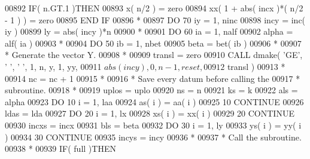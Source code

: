 \begin{DoxyCode}
00892                   \textcolor{keywordflow}{IF}( n.GT.1 )\textcolor{keywordflow}{THEN}
00893                      x( n/2 ) = zero
00894                      xx( 1 + abs( incx )*( n/2 - 1 ) ) = zero
00895 \textcolor{keywordflow}{                  END IF}
00896 \textcolor{comment}{*}
00897                   \textcolor{keywordflow}{DO} 70 iy = 1, ninc
00898                      incy = inc( iy )
00899                      ly = abs( incy )*n
00900 \textcolor{comment}{*}
00901                      \textcolor{keywordflow}{DO} 60 ia = 1, nalf
00902                         alpha = alf( ia )
00903 \textcolor{comment}{*}
00904                         \textcolor{keywordflow}{DO} 50 ib = 1, nbet
00905                            beta = bet( ib )
00906 \textcolor{comment}{*}
00907 \textcolor{comment}{*                          Generate the vector Y.}
00908 \textcolor{comment}{*}
00909                            transl = zero
00910                            \textcolor{keyword}{CALL }dmake( \textcolor{stringliteral}{'GE'}, \textcolor{stringliteral}{' '}, \textcolor{stringliteral}{' '}, 1, n, y, 1, yy,
00911      $                                 abs( incy ), 0, n - 1, reset,
00912      $                                 transl )
00913 \textcolor{comment}{*}
00914                            nc = nc + 1
00915 \textcolor{comment}{*}
00916 \textcolor{comment}{*                          Save every datum before calling the}
00917 \textcolor{comment}{*                          subroutine.}
00918 \textcolor{comment}{*}
00919                            uplos = uplo
00920                            ns = n
00921                            ks = k
00922                            als = alpha
00923                            \textcolor{keywordflow}{DO} 10 i = 1, laa
00924                               as( i ) = aa( i )
00925    10                      \textcolor{keywordflow}{CONTINUE}
00926                            ldas = lda
00927                            \textcolor{keywordflow}{DO} 20 i = 1, lx
00928                               xs( i ) = xx( i )
00929    20                      \textcolor{keywordflow}{CONTINUE}
00930                            incxs = incx
00931                            bls = beta
00932                            \textcolor{keywordflow}{DO} 30 i = 1, ly
00933                               ys( i ) = yy( i )
00934    30                      \textcolor{keywordflow}{CONTINUE}
00935                            incys = incy
00936 \textcolor{comment}{*}
00937 \textcolor{comment}{*                          Call the subroutine.}
00938 \textcolor{comment}{*}
00939                            \textcolor{keywordflow}{IF}( full )\textcolor{keywordflow}{THEN}

\end{DoxyCode}
